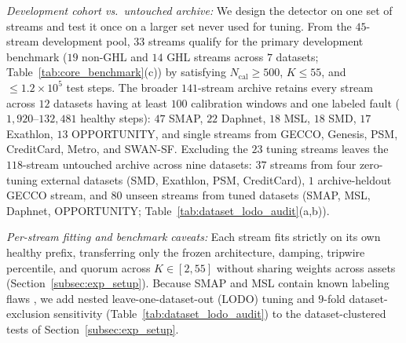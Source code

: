 \noindent\emph{Development cohort vs.\ untouched archive:} We design the detector on one set of streams and test it once on a larger set never used for tuning. From the $45$-stream development pool, $33$ streams qualify for the primary development benchmark ($19$ non-GHL and $14$ GHL streams across $7$ datasets; Table~\ref{tab:core_benchmark}(c)) by satisfying $N_{\text{cal}}{\ge}500$, $K{\le}55$, and ${\le}1.2{\times}10^5$ test steps. The broader $141$-stream archive retains every stream across $12$ datasets having at least $100$ calibration windows and one labeled fault ($1{,}920\text{--}132{,}481$ healthy steps): $47$ SMAP, $22$ Daphnet, $18$ MSL, $18$ SMD, $17$ Exathlon, $13$ OPPORTUNITY, and single streams from GECCO, Genesis, PSM, CreditCard, Metro, and SWAN-SF. Excluding the $23$ tuning streams leaves the $118$-stream untouched archive across nine datasets: $37$ streams from four zero-tuning external datasets (SMD, Exathlon, PSM, CreditCard), $1$ archive-heldout GECCO stream, and $80$ unseen streams from tuned datasets (SMAP, MSL, Daphnet, OPPORTUNITY; Table~\ref{tab:dataset_lodo_audit}(a,b)).

\noindent\emph{Per-stream fitting and benchmark caveats:} Each stream fits strictly on its own healthy prefix, transferring only the frozen architecture, damping, tripwire percentile, and quorum across $K{\in}[2,55]$ without sharing weights across assets (Section~\ref{subsec:exp_setup}). Because SMAP and MSL contain known labeling flaws \cite{wu2023flawed}, we add nested leave-one-dataset-out (LODO) tuning and $9$-fold dataset-exclusion sensitivity (Table~\ref{tab:dataset_lodo_audit}) to the dataset-clustered tests of Section~\ref{subsec:exp_setup}.
